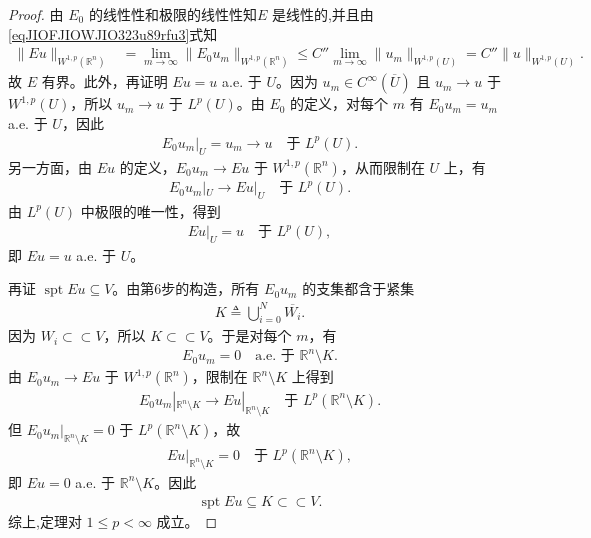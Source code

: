 \documentclass[../../main.tex]{subfiles}%
\begin{document}
\begin{proof}
由 \(E_0\) 的线性性和极限的线性性知\(E\) 是线性的,并且由\eqref{eqJIOFJIOWJIO323u89rfu3}式知
\begin{align*}
\|E u\|_{W^{1,p}(\mathbb{R}^n)}
&=\lim\limits_{m\to\infty}\|E_0 u_m\|_{W^{1,p}(\mathbb{R}^n)}
\leqslant C''\lim\limits_{m\to\infty}\|u_m\|_{W^{1,p}(U)}
=C''\|u\|_{W^{1,p}(U)}.
\end{align*}
故 \(E\) 有界。此外，再证明 \(Eu=u\) a.e. 于 \(U\)。因为 \(u_m\in C^\infty(\overline U)\) 且 \(u_m\to u\) 于 \(W^{1,p}(U)\)，所以 \(u_m\to u\) 于 \(L^p(U)\)。由 \(E_0\) 的定义，对每个 \(m\) 有 \(E_0 u_m=u_m\) a.e. 于 \(U\)，因此
\begin{align*}
E_0 u_m|_U=u_m\to u\quad \text{于 } L^p(U).
\end{align*}
另一方面，由 \(Eu\) 的定义，\(E_0 u_m\to Eu\) 于 \(W^{1,p}(\mathbb R^n)\)，从而限制在 \(U\) 上，有
\begin{align*}
E_0 u_m|_U\to Eu|_U\quad \text{于 } L^p(U).
\end{align*}
由 \(L^p(U)\) 中极限的唯一性，得到
\begin{align*}
Eu|_U=u\quad \text{于 } L^p(U),
\end{align*}
即 \(Eu=u\) a.e. 于 \(U\)。

再证 \(\operatorname{spt}Eu\subseteq V\)。由第6步的构造，所有 \(E_0 u_m\) 的支集都含于紧集
\begin{align*}
K\triangleq \bigcup_{i=0}^N \overline{W_i}.
\end{align*}
因为 \(W_i\subset\subset V\)，所以 \(K\subset\subset V\)。于是对每个 \(m\)，有
\begin{align*}
E_0 u_m=0\quad \text{a.e. 于 } \mathbb R^n\setminus K.
\end{align*}
由 \(E_0 u_m\to Eu\) 于 \(W^{1,p}(\mathbb R^n)\)，限制在 \(\mathbb R^n\setminus K\) 上得到
\begin{align*}
E_0 u_m|_{\mathbb R^n\setminus K}\to Eu|_{\mathbb R^n\setminus K}\quad \text{于 } L^p(\mathbb R^n\setminus K).
\end{align*}
但 \(E_0 u_m|_{\mathbb R^n\setminus K}=0\) 于 \(L^p(\mathbb R^n\setminus K)\)，故
\begin{align*}
Eu|_{\mathbb R^n\setminus K}=0\quad \text{于 } L^p(\mathbb R^n\setminus K),
\end{align*}
即 \(Eu=0\) a.e. 于 \(\mathbb R^n\setminus K\)。因此
\begin{align*}
\operatorname{spt}Eu\subseteq K\subset\subset V.
\end{align*}
综上,定理对 \(1\leqslant p<\infty\) 成立。


\end{proof}
\end{document}
